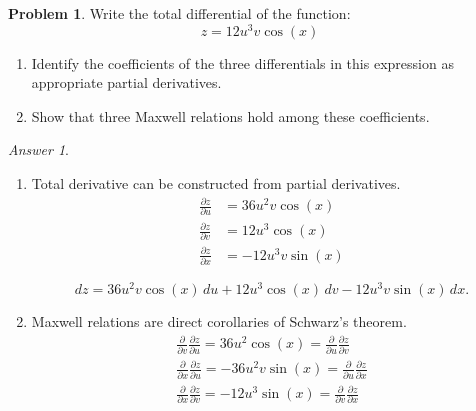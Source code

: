 \documentclass[a4paper, 12pt]{article}
\theoremstyle{definition}
\newtheorem{problem}{Problem}[section]
\theoremstyle{remark}
\newtheorem*{answer}{Answer}
\begin{document}
\begin{problem}
    Write the total differential of the function:
    \[ z = 12 u^3 v \cos(x) \]

    \begin{enumerate}
        \item Identify the coefficients of the three differentials in this
            expression as appropriate partial derivatives.
        \item Show that three Maxwell relations hold among these coefficients.
    \end{enumerate}
    
    \begin{answer}
        \begin{enumerate}
            \item Total derivative can be constructed from partial derivatives.
                \begin{align*}
                    \frac{\partial z}{\partial u} &= 36 u^2 v \cos(x) \\
                    \frac{\partial z}{\partial v} &= 12 u^3 \cos(x) \\
                    \frac{\partial z}{\partial x} &= -12 u^3 v \sin(x)
                \end{align*}

                \[ dz = 36 u^2 v \cos(x) \,du
                    + 12 u^3 \cos(x) \,dv
                    - 12 u^3 v \sin(x) \,dx.\]

            \item Maxwell relations are direct corollaries of Schwarz's theorem.
                \[
                    \begin{gathered}
                        \frac\partial{\partial v}\frac{\partial z}{\partial u}
                            = 36 u^2 \cos(x)
                            = \frac\partial{\partial u}\frac{\partial z}{\partial v} \\
                        \frac\partial{\partial x}\frac{\partial z}{\partial u}
                            = -36 u^2 v \sin(x)
                            = \frac\partial{\partial u}\frac{\partial z}{\partial x} \\
                        \frac\partial{\partial x}\frac{\partial z}{\partial v}
                            = -12 u^3 \sin(x)
                            = \frac\partial{\partial v}\frac{\partial z}{\partial x} \\
                    \end{gathered}
                \]
        \end{enumerate}
    \end{answer}
\end{problem}
\end{document}
